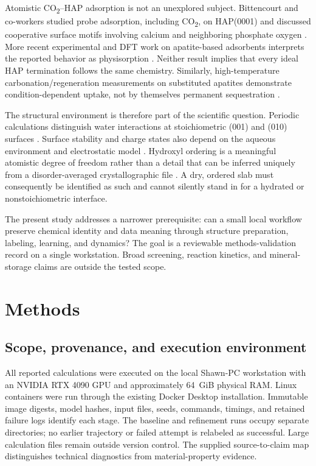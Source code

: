 \documentclass[11pt,a4paper]{article}
\newcommand{\COtwo}{CO\textsubscript{2}}
\begin{document}
Atomistic \COtwo--HAP adsorption is not an unexplored subject. Bittencourt and co-workers studied probe adsorption, including \COtwo, on HAP(0001) and discussed cooperative surface motifs involving calcium and neighboring phosphate oxygen \citep{bittencourt2021acidbase}. More recent experimental and DFT work on apatite-based adsorbents interprets the reported behavior as physisorption \citep{bouharras2025adsorption}. Neither result implies that every ideal HAP termination follows the same chemistry. Similarly, high-temperature carbonation/regeneration measurements on substituted apatites demonstrate condition-dependent uptake, not by themselves permanent sequestration \citep{nowicki2024capture}.

The structural environment is therefore part of the scientific question. Periodic calculations distinguish water interactions at stoichiometric (001) and (010) surfaces \citep{corno2009water}. Surface stability and charge states also depend on the aqueous environment and electrostatic model \citep{saito2021surfaces}. Hydroxyl ordering is a meaningful atomistic degree of freedom rather than a detail that can be inferred uniquely from a disorder-averaged crystallographic file \citep{slepko2011ordering}. A dry, ordered slab must consequently be identified as such and cannot silently stand in for a hydrated or nonstoichiometric interface.

The present study addresses a narrower prerequisite: can a small local workflow preserve chemical identity and data meaning through structure preparation, labeling, learning, and dynamics? The goal is a reviewable methods-validation record on a single workstation. Broad screening, reaction kinetics, and mineral-storage claims are outside the tested scope.

\section{Methods}
\subsection{Scope, provenance, and execution environment}
All reported calculations were executed on the local Shawn-PC workstation with an NVIDIA RTX 4090 GPU and approximately 64~GiB physical RAM. Linux containers were run through the existing Docker Desktop installation. Immutable image digests, model hashes, input files, seeds, commands, timings, and retained failure logs identify each stage. The baseline and refinement runs occupy separate directories; no earlier trajectory or failed attempt is relabeled as successful. Large calculation files remain outside version control. The supplied source-to-claim map distinguishes technical diagnostics from material-property evidence.
\end{document}
